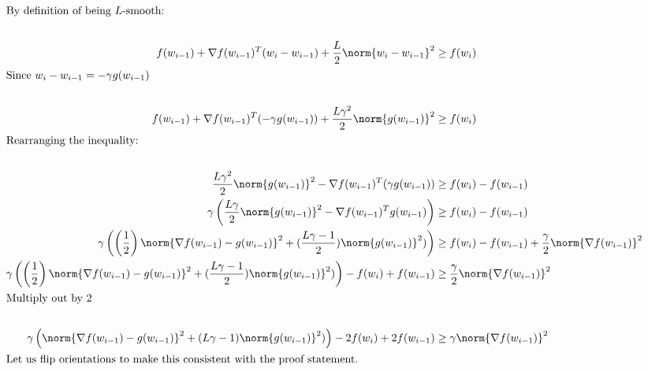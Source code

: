 \documentclass[../main.tex]{subfiles}
\begin{document}
\begin{align*}
    \intertext{By definition of being $L$-smooth:} \\
    f(w_{i-1}) + \nabla f(w_{i-1})^T(w_{i} - w_{i-1}) + \frac{L}{2}\norm{w_{i} - w_{i-1}}^2 &\geq f(w_i) \\
    \intertext{Since $w_{i} - w_{i-1} = -\gamma g(w_{i-1})$} \\
    f(w_{i-1}) + \nabla f(w_{i-1})^T(-\gamma g(w_{i-1})) + \frac{L\gamma^2}{2}\norm{g(w_{i-1})}^2 &\geq f(w_i) \\
    \intertext{Rearranging the inequality:} \\
    \frac{L\gamma^2}{2}\norm{g(w_{i-1})}^2  - \nabla f(w_{i-1})^T(\gamma g(w_{i-1}))  &\geq f(w_i) - f(w_{i-1}) \\
    \gamma \left(\frac{L\gamma}{2}\norm{g(w_{i-1})}^2  - \nabla f(w_{i-1})^T g(w_{i-1})\right)  &\geq f(w_i) - f(w_{i-1}) \\
    \gamma \left( \left(\frac{1}{2}\right)\norm{\nabla f(w_{i-1}) - g(w_{i-1})}^2 + (\frac{L\gamma - 1}{2})\norm{g(w_{i-1})}^2)\right)  &\geq f(w_i) - f(w_{i-1}) + \frac{\gamma}{2}\norm{\nabla f(w_{i-1})}^2 \\
    \gamma \left( \left(\frac{1}{2}\right)\norm{\nabla f(w_{i-1}) - g(w_{i-1})}^2 + (\frac{L\gamma - 1}{2})\norm{g(w_{i-1})}^2)\right) - f(w_i) + f(w_{i-1}) &\geq\frac{\gamma}{2}\norm{\nabla f(w_{i-1})}^2 \\
    \intertext{Multiply out by $2$} \\
    \gamma \left( \norm{\nabla f(w_{i-1}) - g(w_{i-1})}^2 + (L\gamma - 1)\norm{g(w_{i-1})}^2)\right) - 2f(w_i) + 2f(w_{i-1}) &\geq \gamma\norm{\nabla f(w_{i-1})}^2 \\
    \intertext{Let us flip orientations to make this consistent with the proof statement.} \\
\end{align*}
\end{document}
